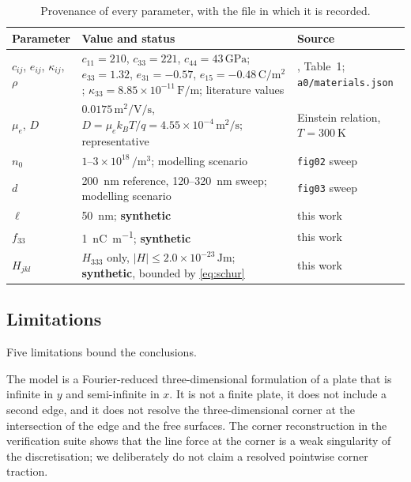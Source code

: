 \begin{table}[t]
\centering
\caption{Provenance of every parameter, with the file in which it is recorded.}
\label{tab:provenance}
\small
\begin{tabular}{@{}p{}p{}p{}@{}}
\toprule
Parameter & Value and status & Source \\
\midrule
$c_{ij}$, $e_{ij}$, $\kappa_{ij}$, $\rho$ &
$c_{11}=210$, $c_{33}=221$, $c_{44}=43\,\si{\giga\pascal}$;
$e_{33}=1.32$, $e_{31}=-0.57$, $e_{15}=-0.48\,\si{\coulomb\per\square\metre}$;
$\kappa_{33}=8.85\times10^{-11}\,\si{\farad\per\metre}$; literature values &
\cite{zhang2025pscplate}, Table~1;
\texttt{a0/materials.json} \\
$\mu_e$, $D$ & $0.0175\,\si{\square\metre\per\volt\per\second}$,
$D=\mu_e k_BT/q=4.55\times10^{-4}\,\si{\square\metre\per\second}$; representative &
Einstein relation, $T=\SI{300}{\kelvin}$ \\
$n_0$ & $1\text{--}3\times10^{18}\,\si{\per\cubic\metre}$; modelling scenario &
\texttt{fig02} sweep \\
$d$ & \SI{200}{\nano\metre} reference, \SI{120}{}--\SI{320}{\nano\metre} sweep;
modelling scenario & \texttt{fig03} sweep \\
$\ell$ & \SI{50}{\nano\metre}; \textbf{synthetic} & this work \\
$f_{33}$ & \SI{1}{\nano\coulomb\per\metre}; \textbf{synthetic} & this work \\
$H_{jkl}$ & $H_{333}$ only, $|H|\le2.0\times10^{-23}\,\si{\joule\metre}$;
\textbf{synthetic}, bounded by \cref{eq:schur} & this work \\
\bottomrule
\end{tabular}
\end{table}

\subsection{Limitations}
\label{sec:disc_limitations}

Five limitations bound the conclusions.

The model is a Fourier-reduced three-dimensional formulation of a plate that is
infinite in $y$ and semi-infinite in $x$.  It is not a finite plate, it does not
include a second edge, and it does not resolve the three-dimensional corner at
the intersection of the edge and the free surfaces.  The corner reconstruction
in the verification suite shows that the line force at the corner is a weak
singularity of the discretisation; we deliberately do not claim a resolved
pointwise corner traction.

